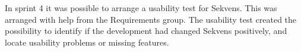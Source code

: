 In sprint 4 it was possible to arrange a usability test for Sekvens. This was arranged with help from the Requirements group. The usability test created the possibility to identify if the development had changed Sekvens positively, and locate usability problems or missing features.